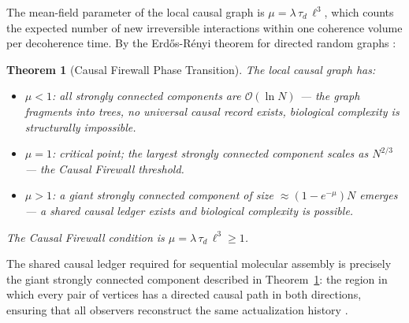 \documentclass[11pt,a4paper]{article}
\theoremstyle{plain}
\newtheorem{theorem}{Theorem}[section]
\theoremstyle{definition}
\theoremstyle{remark}
\begin{document}
The mean-field parameter of the local causal graph is
$\mu = \lambda\,\tau_d\,\ell^3$, which counts the expected number of new
irreversible interactions within one coherence volume per decoherence time.
By the Erd\H{o}s-R\'{e}nyi theorem for directed random graphs
\citep{ErdosRenyi1960}:

\begin{theorem}[Causal Firewall Phase Transition]
\label{thm:percolation}
The local causal graph has:
\begin{itemize}[noitemsep]
  \item $\mu < 1$: all strongly connected components are $\mathcal{O}(\ln N)$
    --- the graph fragments into trees, no universal causal record exists,
    biological complexity is structurally impossible.
  \item $\mu = 1$: critical point; the largest strongly connected component
    scales as $N^{2/3}$ --- the Causal Firewall threshold.
  \item $\mu > 1$: a giant strongly connected component of size
    $\approx(1-e^{-\mu})N$ emerges --- a shared causal ledger exists and
    biological complexity is possible.
\end{itemize}
The Causal Firewall condition is $\mu = \lambda\,\tau_d\,\ell^3 \geq 1$.
\end{theorem}

The shared causal ledger required for sequential molecular assembly is
precisely the giant strongly connected component described in
Theorem~\ref{thm:percolation}: the region in which every pair of vertices
has a directed causal path in both directions, ensuring that all observers
reconstruct the same actualization history \citep{Sandeman2026RACI}.
\end{document}
